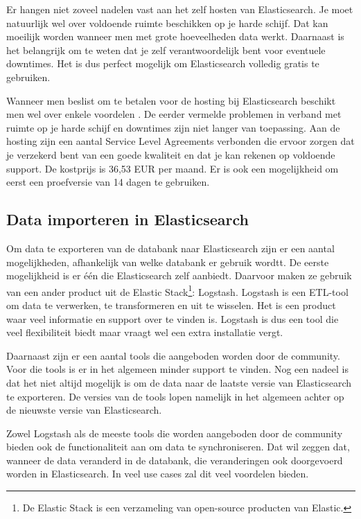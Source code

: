 Er hangen niet zoveel nadelen vast aan het zelf hosten van Elasticsearch. Je moet natuurlijk wel over voldoende ruimte beschikken op je harde schijf. Dat kan moeilijk worden wanneer men met grote hoeveelheden data werkt. Daarnaast is het belangrijk om te weten dat je zelf verantwoordelijk bent voor eventuele downtimes. Het is dus perfect mogelijk om Elasticsearch volledig gratis te gebruiken. 

Wanneer men beslist om te betalen voor de hosting bij Elasticsearch beschikt men wel over enkele voordelen . De eerder vermelde problemen in verband met ruimte op je harde schijf en downtimes zijn niet langer van toepassing.  Aan de hosting zijn een aantal Service Level Agreements verbonden die ervoor zorgen dat je verzekerd bent van een goede kwaliteit en dat je kan rekenen op voldoende support. De kostprijs is 36,53 EUR per maand. Er is ook een mogelijkheid om eerst een proefversie van 14 dagen te gebruiken.

\subsection{Data importeren in Elasticsearch}

Om data te exporteren van de databank naar Elasticsearch zijn er een aantal mogelijkheden, afhankelijk van welke databank er gebruik wordtt. De eerste mogelijkheid is er één die Elasticsearch zelf aanbiedt. Daarvoor maken ze gebruik van een ander product uit de Elastic Stack\footnote{De Elastic Stack is een verzameling van open-source producten van Elastic.}: Logstash. Logstash is een ETL-tool om data te verwerken, te transformeren en uit te wisselen. Het is een product waar veel informatie en support over te vinden is. Logstash is dus een tool die veel flexibiliteit biedt maar vraagt wel een extra installatie vergt. 

Daarnaast zijn er een aantal tools die aangeboden worden door de community. Voor die tools is er in het algemeen minder support te vinden. Nog een nadeel is dat het niet altijd mogelijk is om de data naar de laatste versie van Elasticsearch te exporteren. De versies van de tools lopen namelijk in het algemeen achter op de nieuwste versie van Elasticsearch. 

Zowel Logstash als de meeste tools die worden aangeboden door de community bieden ook de functionaliteit aan om data te synchroniseren. Dat wil zeggen dat, wanneer de data veranderd in de databank, die veranderingen ook doorgevoerd worden in Elasticsearch. In veel use cases zal dit veel voordelen bieden. 

